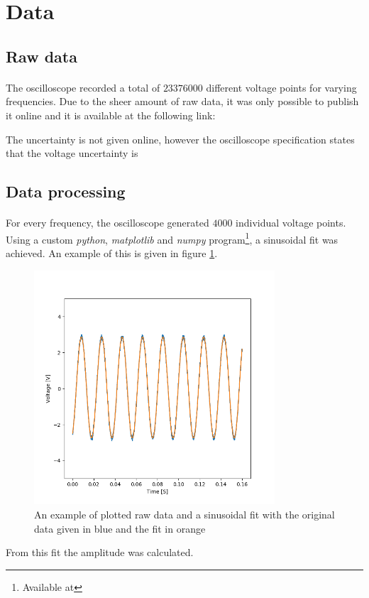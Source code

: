 \documentclass[a4paper, 12pt]{article}
\begin{document}
\section{Data}

\subsection{Raw data}
\paragraph*{}
The oscilloscope recorded a total of $23376000$ different voltage points for 
varying frequencies. Due to the sheer amount of raw data, it was only possible 
to publish it online and it is available at the following link:

The uncertainty is not given online, however the oscilloscope specification 
states that the voltage uncertainty is %

\subsection{Data processing}
\paragraph*{}
For every frequency, the oscilloscope generated $4000$ individual voltage 
points. Using a custom \textit{python}, \textit{matplotlib} and \textit{numpy} 
program\footnote{
	Available at %
}, a sinusoidal fit was achieved. An example of this is given in figure 
\ref{fig:process1-example}.
\begin{figure}[ht]
	\centering
	\includegraphics[width=0.8\textwidth]{img/process1-example}
	\caption{An example of plotted raw data and a sinusoidal fit with the 
	original data given in blue and the fit in orange}
	\label{fig:process1-example}
\end{figure}
From this fit the amplitude was calculated. 
\end{document}
